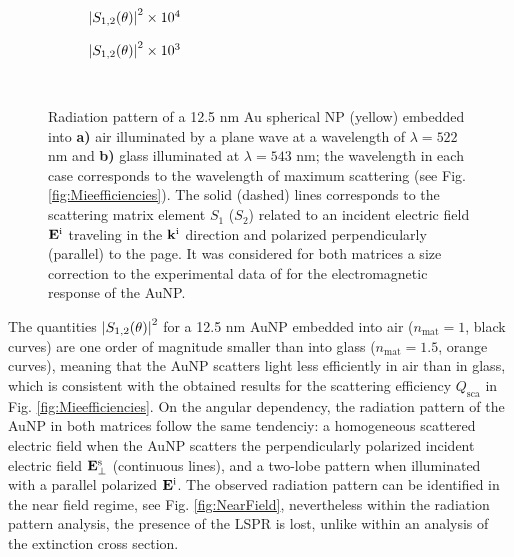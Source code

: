 \begin{figure}[t!]
	\small\centering
	\def\svgwidth{.9\textwidth}
		\vspace*{1.5em}
		\hspace*{-.25\textwidth}
	\begin{subfigure}{.45\textwidth}%
		\caption{$\abs{S_{1,2}(\theta)}^2\times 10^4$} \label{fig:ScatteringMaps:a}%
		\end{subfigure}%
	\begin{subfigure}{.45\textwidth}%
		\caption{$\abs{S_{1,2}(\theta)}^2\times 10^3$}\label{fig:ScatteringMaps:b}%
		\end{subfigure}%
	\vspace*{-4.5em}\\
	\vspace*{-.5em}
	\caption[Radiation Pattern of a 12.5 nm Au Spherical NP embedded into Air and Glass]{Radiation pattern of a 12.5 nm Au spherical NP (yellow) embedded into \textbf{a)} air illuminated by a plane wave at a wavelength of $\lambda = 522$ nm and \textbf{b)} glass illuminated at $\lambda = 543$ nm; the wavelength in each case corresponds to the wavelength of maximum scattering (see Fig. \ref{fig:Mieefficiencies}). The solid (dashed) lines corresponds to the scattering matrix element $S_1$ ($S_2$) related to an incident electric field $\vb{E}^\text{i}$ traveling in the $\vb{k}^\text{i}$ direction  and polarized perpendicularly (parallel) to the page. It was considered for both matrices a size correction to the experimental data of \citeauthor{johnson_optical_1972} \cite{johnson_optical_1972} for the electromagnetic response of the AuNP.}%
	\label{fig:ScatteringMaps}
 \end{figure}

The quantities $\abs{S_{1,2}(\theta)}^2$ for a 12.5 nm AuNP embedded into air ($n_\text{mat} = 1$, black curves) are one order of magnitude smaller  than into glass ($n_\text{mat} = 1.5$, orange curves), meaning that the AuNP scatters light less efficiently in air than in glass, which is consistent with the obtained results for the scattering efficiency $Q_\text{sca}$ in Fig. \ref{fig:Mieefficiencies}. On the angular dependency, the radiation pattern of the AuNP in both matrices follow the same tendenciy: a homogeneous scattered electric field when the AuNP scatters the perpendicularly polarized incident electric field  $\vb{E}^\text{s}_\perp$ (continuous lines), and a two-lobe pattern when illuminated with a parallel polarized $\vb{E}^\text{i}$. The observed radiation pattern can be identified in the near field regime, see Fig. \ref{fig:NearField}, nevertheless within the radiation pattern analysis, the presence of the LSPR is lost, unlike within an analysis of the extinction cross section.

